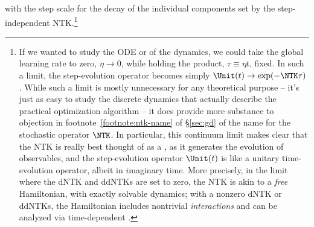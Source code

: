 with the step scale for the decay of the individual components set by the step-independent NTK.\footnote{If we wanted to study the ODE or  of the dynamics, we could take the global learning rate to zero, $\eta\to 0$, while holding the product, $\tau\equiv \eta t$, fixed. In such a limit, the step-evolution operator becomes simply $\Unit(t)\to \exp(-\NTK\tau)$. While such a limit is mostly unnecessary for any theoretical purpose -- it's just as easy to study the discrete dynamics that actually describe the practical optimization algorithm -- it does provide more substance to objection in footnote~\ref{footnote:ntk-name} of \S\ref{sec:gd} of the name  for the stochastic operator $\NTK$.
In particular, this continuum limit makes clear that the NTK is really best thought of as a , as it generates the evolution of observables, and the step-evolution operator $\Unit(t)$ is like a unitary time-evolution operator, albeit in $i$maginary time.
More precisely, in the limit where the dNTK and ddNTKs are set to zero, the NTK is akin to a \emph{free} Hamiltonian, with exactly solvable dynamics; with a nonzero dNTK or ddNTKs, the Hamiltonian includes nontrivial \emph{interactions} and can be analyzed via time-dependent .\label{eq:footnote-continuum-limit}
}










